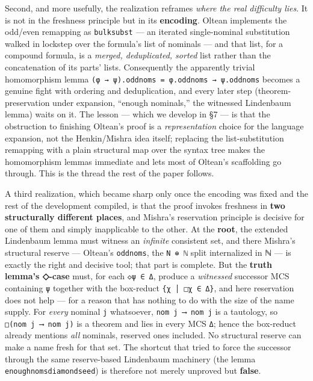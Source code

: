 \documentclass[11pt,a4paper]{article}
\renewcommand{\_}{\origtextunderscore\allowbreak}
\begin{document}
Second, and more usefully, the realization reframes \emph{where the real difficulty lies}. It is not in the freshness principle but in its \textbf{encoding}. Oltean implements the odd/even remapping as \texttt{bulk\_subst} --- an iterated single-nominal substitution walked in lockstep over the formula's list of nominals --- and that list, for a compound formula, is a \emph{merged, deduplicated, sorted} list rather than the concatenation of its parts' lists. Consequently the apparently trivial homomorphism lemma \texttt{(φ\ →\ ψ).odd\_noms\ =\ φ.odd\_noms\ →\ ψ.odd\_noms} becomes a genuine fight with ordering and deduplication, and every later step (theorem-preservation under expansion, ``enough nominals,'' the witnessed Lindenbaum lemma) waits on it. The lesson --- which we develop in §7 --- is that the obstruction to finishing Oltean's proof is a \emph{representation} choice for the language expansion, not the Henkin/Mishra idea itself; replacing the list-substitution remapping with a plain structural map over the syntax tree makes the homomorphism lemmas immediate and lets most of Oltean's scaffolding go through. This is the thread the rest of the paper follows.

A third realization, which became sharp only once the encoding was fixed and the rest of the development compiled, is that the proof invokes freshness in \textbf{two structurally different places}, and Mishra's reservation principle is decisive for one of them and simply inapplicable to the other. At the \textbf{root}, the extended Lindenbaum lemma must witness an \emph{infinite} consistent set, and there Mishra's structural reserve --- Oltean's \texttt{odd\_noms}, the \texttt{N\ ⊕\ ℕ} split internalized in ℕ --- is exactly the right and decisive tool; that part is complete. But the \textbf{truth lemma's ◇-case} must, for each \texttt{◇ψ\ ∈\ Δ}, produce a \emph{witnessed} successor MCS containing \texttt{ψ} together with the box-reduct \texttt{\{χ\ │\ □χ\ ∈\ Δ\}}, and here reservation does not help --- for a reason that has nothing to do with the size of the name supply. For \emph{every} nominal \texttt{j} whatsoever, \texttt{nom\ j\ ⟶\ nom\ j} is a tautology, so \texttt{□(nom\ j\ ⟶\ nom\ j)} is a theorem and lies in every MCS \texttt{Δ}; hence the box-reduct already mentions \emph{all} nominals, reserved ones included. No structural reserve can make a name fresh for that set. The shortcut that tried to force the successor through the same reserve-based Lindenbaum machinery (the lemma \texttt{enough\_noms\_diamond\_seed}) is therefore not merely unproved but \textbf{false}.
\end{document}

